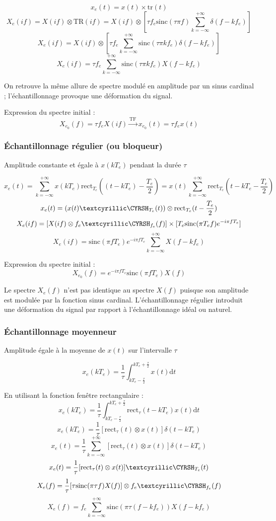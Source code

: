 \documentclass[a4paper,12pt]{article}
\begin{document}
\[ x_e(t) = x(t) \times \mathrm{tr}(t) \]
\[ X_e(if) = X(if) \otimes \mathrm{TR}(if) = X(if) \otimes [\tau f_e \mathrm{sinc}(\tau \pi f) \sum_{k=-\infty}^{+\infty} \delta(f-kf_e)] \]
\[ X_e(if) = X(if) \otimes [\tau f_e \sum_{k=-\infty}^{+\infty} \mathrm{sinc}(\tau \pi kf_e) \delta(f-kf_e)] \]
\[ X_e(if) = \tau f_e \sum_{k=-\infty}^{+\infty} \mathrm{sinc}(\tau \pi kf_e) X(f-kf_e) \]

On retrouve la même allure de spectre modulé en amplitude par un sinus cardinal ; l'échantillonnage provoque une déformation du signal.

Expression du spectre initial :
\[ X_{e_0}(f) = \tau f_e X(if) \xrightarrow{\mathrm{TF}^{}} x_{e_0}(t) = \tau f_e x(t) \]

\subsubsection{Échantillonnage régulier (ou bloqueur)}

Amplitude constante et égale à $x(kT_e)$ pendant la durée $\tau$

\[ x_e(t) = \sum_{k=-\infty}^{+\infty} x(kT_e) \mathrm{rect}_{T_e}((t-kT_e)-\dfrac{T_e}{2}) = x(t) \sum_{k=-\infty}^{+\infty} \mathrm{rect}_{T_e}(t-kT_e-\dfrac{T_e}{2}) \]
\[ x_e(t) = (x(t) \dirac_{T_e}(t)) \otimes \mathrm{rect}_{T_e}(t-\dfrac{T_e}{2}) \]
\[ X_e(if) = [X(if) \otimes f_e \dirac_{f_e}(f)] \times [T_e \mathrm{sinc}(\pi T_e f) e^{-i\pi fT_e}] \]
\[ X_e(if) = \mathrm{sinc}(\pi fT_e) e^{-i\pi fT_e} \sum_{k=-\infty}^{+\infty} X(f-kf_e) \]

Expression du spectre initial :
\[ X_{e_0}(f) = e^{-i\pi fT_e} \mathrm{sinc}(\pi fT_e) X(f) \]

Le spectre $X_e(f)$ n'est pas identique au spectre $X(f)$ puisque son amplitude est modulée par la fonction sinus cardinal. L'échantillonnage régulier introduit une déformation du signal par rapport à l'échantillonnage idéal ou naturel.

\subsubsection{Échantillonnage moyenneur}

Amplitude égale à la moyenne de $x(t)$ sur l'intervalle $\tau$

\[ x_e(kT_e) = \dfrac{1}{\tau} \int_{kT_e - \frac{\tau}{2}}^{kT_e + \frac{\tau}{2}} x(t) \mathrm{d}t \]

En utilisant la fonction fenêtre rectangulaire :
\[ x_e(kT_e) = \dfrac{1}{\tau} \int_{kT_e - \frac{\tau}{2}}^{kT_e + \frac{\tau}{2}} \mathrm{rect}_\tau(t-kT_e) x(t) \mathrm{d}t \]
\[ x_e(kT_e) = \dfrac{1}{\tau} [\mathrm{rect}_\tau(t) \otimes x(t)] \delta(t-kT_e) \]
\[ x_e(t) = \dfrac{1}{\tau} \sum_{k = -\infty}^{+\infty} [\mathrm{rect}_\tau (t) \otimes x(t)] \delta(t-kT_e) \]
\[ x_e(t) = \dfrac{1}{\tau} [\mathrm{rect}_\tau (t) \otimes x(t)] \dirac_{T_e}(t) \]
\[ X_e(f) = \dfrac{1}{\tau} [\tau \mathrm{sinc}(\pi \tau f) X(f)] \otimes f_e \dirac_{f_e}(f) \]
\[ X_e(f) = f_e \sum_{k=-\infty}^{+\infty} \mathrm{sinc}(\pi \tau (f-kf_e)) X(f-kf_e) \]
\end{document}
